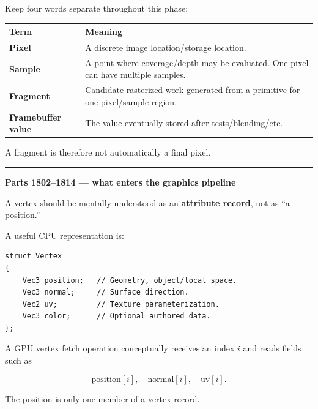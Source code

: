 Keep four words separate throughout this phase:

{\def\LTcaptype{none} %
\begin{longtable}[]{@{}
  >{\raggedright\arraybackslash}p{}
  >{\raggedright\arraybackslash}p{}@{}}
\toprule\noalign{}
\begin{minipage}[b]{\linewidth}\raggedright
Term
\end{minipage} & \begin{minipage}[b]{\linewidth}\raggedright
Meaning
\end{minipage} \\
\midrule\noalign{}
\endhead
\bottomrule\noalign{}
\endlastfoot
\textbf{Pixel} & A discrete image location/storage location. \\
\textbf{Sample} & A point where coverage/depth may be evaluated. One pixel can have multiple samples. \\
\textbf{Fragment} & Candidate rasterized work generated from a primitive for one pixel/sample region. \\
\textbf{Framebuffer value} & The value eventually stored after tests/blending/etc. \\
\end{longtable}
}

A fragment is therefore not automatically a final pixel.

\begin{center}\rule{0.5\linewidth}{0.5pt}\end{center}

\textbf{Parts 1802--1814 --- what enters the graphics pipeline}

A vertex should be mentally understood as an \textbf{attribute record}, not as ``a position.''

A useful CPU representation is:

\begin{verbatim}
struct Vertex
{
    Vec3 position;   // Geometry, object/local space.
    Vec3 normal;     // Surface direction.
    Vec2 uv;         // Texture parameterization.
    Vec3 color;      // Optional authored data.
};
\end{verbatim}

A GPU vertex fetch operation conceptually receives an index \(i\) and reads fields such as

\[
\text{position}[i],\quad
\text{normal}[i],\quad
\text{uv}[i].
\]

The position is only one member of a vertex record.

